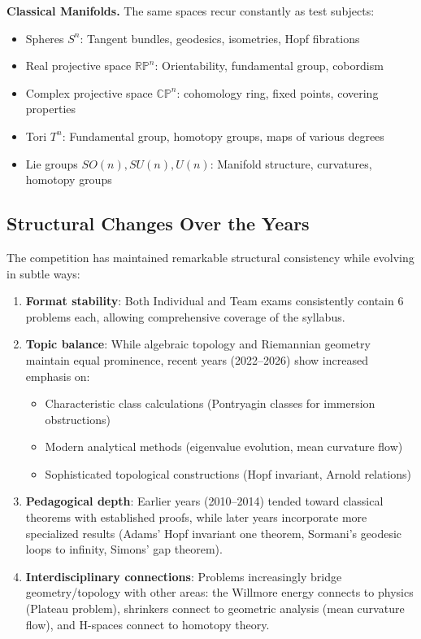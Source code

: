 \medskip\noindent\textbf{Classical Manifolds.}
The same spaces recur constantly as test subjects:
\begin{itemize}
    \item Spheres $S^n$: Tangent bundles, geodesics, isometries, Hopf fibrations
    \item Real projective space $\mathbb{RP}^n$: Orientability, fundamental group, cobordism
    \item Complex projective space $\mathbb{CP}^n$: cohomology ring, fixed points, covering properties
    \item Tori $T^n$: Fundamental group, homotopy groups, maps of various degrees
    \item Lie groups $SO(n), SU(n), U(n)$: Manifold structure, curvatures, homotopy groups
\end{itemize}

\subsection*{Structural Changes Over the Years}

The competition has maintained remarkable structural consistency while evolving in subtle ways:

\begin{enumerate}
    \item \textbf{Format stability}: Both Individual and Team exams consistently contain 6 problems each,
          allowing comprehensive coverage of the syllabus.

    \item \textbf{Topic balance}: While algebraic topology and Riemannian geometry maintain equal
          prominence, recent years (2022--2026) show increased emphasis on:
          \begin{itemize}
              \item Characteristic class calculations (Pontryagin classes for immersion obstructions)
              \item Modern analytical methods (eigenvalue evolution, mean curvature flow)
              \item Sophisticated topological constructions (Hopf invariant, Arnold relations)
          \end{itemize}

    \item \textbf{Pedagogical depth}: Earlier years (2010--2014) tended toward classical theorems with
          established proofs, while later years incorporate more specialized results (Adams' Hopf invariant
          one theorem, Sormani's geodesic loops to infinity, Simons' gap theorem).

    \item \textbf{Interdisciplinary connections}: Problems increasingly bridge geometry/topology with
          other areas: the Willmore energy connects to physics (Plateau problem), shrinkers connect
          to geometric analysis (mean curvature flow), and H-spaces connect to homotopy theory.
\end{enumerate}

